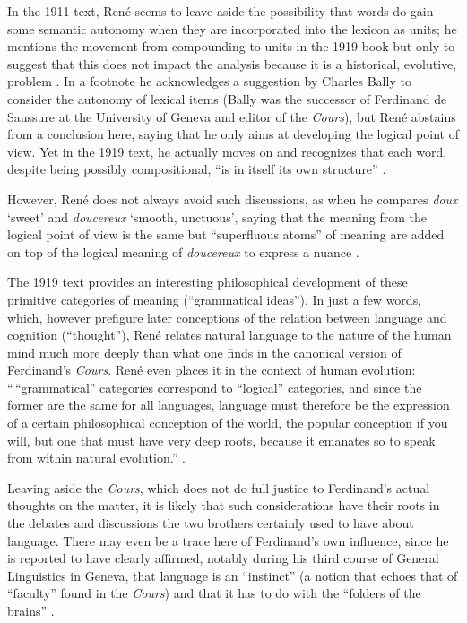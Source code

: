 \documentclass[output=paper]{langsci/langscibook}
\begin{document}
In the 1911 text, René seems to leave aside the possibility that words
do gain some semantic autonomy when they are incorporated into the
lexicon as units; he mentions the movement from compounding to units
in the 1919 book but only to suggest that this does not impact the
analysis because it is a historical, evolutive, problem
\citep[5]{r.desaussure19:structure.logique}. In a footnote
\citep[37]{r.desaussure11:formation} he acknowledges a suggestion by
Charles Bally to consider the autonomy of lexical items (Bally was the
successor of Ferdinand de Saussure at the University of Geneva and
editor of the \textsl{Cours}), but René abstains from a conclusion
here, saying that he only aims at developing the logical point of
view. Yet in the 1919 text, he actually moves on and recognizes that
each word, despite being possibly compositional, “is in itself its own
structure” \citep[27]{r.desaussure19:structure.logique}.

However, René does not always avoid such discussions, as when he
compares \emph{doux} ‘sweet’ and \emph{doucereux} ‘smooth, unctuous’,
saying that the meaning from the logical point of view is the same but
``superfluous atoms'' of meaning are added on top of the logical meaning
of \emph{doucereux} to express a nuance \citep[61--62]{r.desaussure11:formation}.

The 1919 text provides an interesting philosophical development of
these primitive categories of meaning (``grammatical ideas''). In just a
few words, which, however prefigure later conceptions of the relation
between language and cognition (``thought''), René relates natural
language to the nature of the human mind much more deeply than what
one finds in the canonical version of Ferdinand’s \textsl{Cours}. René
even places it in the context of human evolution: ``\,“grammatical”
categories correspond to “logical” categories, and since the former
are the same for all languages, language must therefore be the
expression of a certain philosophical conception of the world, the
popular conception if you will, but one that must have very deep
roots, because it emanates so to speak from within natural evolution.”
\citep[26]{r.desaussure19:structure.logique}.

Leaving aside the \textsl{Cours}, which does not do full justice to
Ferdinand’s actual thoughts on the matter, it is likely that such
considerations have their roots in the debates and discussions the two
brothers certainly used to have about language. There may even be a
trace here of Ferdinand’s own influence, since he is reported to have
clearly affirmed, notably during his third course of General
Linguistics in Geneva, that language is an ``instinct'' (a notion that
echoes that of ``faculty'' found in the \emph{Cours}) and that it has to
do with the ``folders of the brains''
\citep[80]{saussure93:troisieme-cours}.
\end{document}
